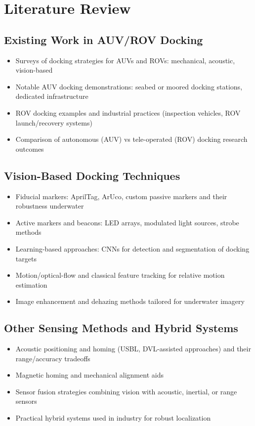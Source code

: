 \section{Literature Review}

\subsection{Existing Work in AUV/ROV Docking}
\begin{itemize}
    \item Surveys of docking strategies for AUVs and ROVs: mechanical, acoustic, vision-based
    \item Notable AUV docking demonstrations: seabed or moored docking stations, dedicated infrastructure
    \item ROV docking examples and industrial practices (inspection vehicles, ROV launch/recovery systems)
    \item Comparison of autonomous (AUV) vs tele-operated (ROV) docking research outcomes
\end{itemize}

\subsection{Vision-Based Docking Techniques}
\begin{itemize}
    \item Fiducial markers: AprilTag, ArUco, custom passive markers and their robustness underwater
    \item Active markers and beacons: LED arrays, modulated light sources, strobe methods
    \item Learning-based approaches: CNNs for detection and segmentation of docking targets
    \item Motion/optical-flow and classical feature tracking for relative motion estimation
    \item Image enhancement and dehazing methods tailored for underwater imagery
\end{itemize}

\subsection{Other Sensing Methods and Hybrid Systems}
\begin{itemize}
    \item Acoustic positioning and homing (USBL, DVL-assisted approaches) and their range/accuracy tradeoffs
    \item Magnetic homing and mechanical alignment aids
    \item Sensor fusion strategies combining vision with acoustic, inertial, or range sensors
    \item Practical hybrid systems used in industry for robust localization
\end{itemize}

